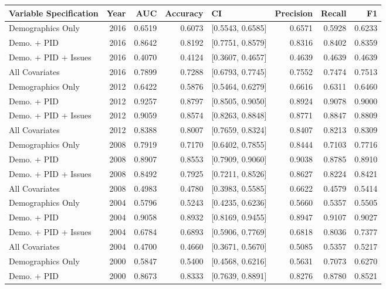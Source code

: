 \begin{longtable}{lrrrlrrr}
  \toprule
Variable Specification & Year & AUC & Accuracy & CI & Precision & Recall & F1 \\ 
  \midrule
Demographics Only & 2016 & 0.6519 & 0.6073 & [0.5543, 0.6585] & 0.6571 & 0.5928 & 0.6233 \\ 
  Demo. + PID & 2016 & 0.8642 & 0.8192 & [0.7751, 0.8579] & 0.8316 & 0.8402 & 0.8359 \\ 
  Demo. + PID + Issues & 2016 & 0.4070 & 0.4124 & [0.3607, 0.4657] & 0.4639 & 0.4639 & 0.4639 \\ 
  All Covariates & 2016 & 0.7899 & 0.7288 & [0.6793, 0.7745] & 0.7552 & 0.7474 & 0.7513 \\ 
  Demographics Only & 2012 & 0.6422 & 0.5876 & [0.5464, 0.6279] & 0.6616 & 0.6311 & 0.6460 \\ 
  Demo. + PID & 2012 & 0.9257 & 0.8797 & [0.8505, 0.9050] & 0.8924 & 0.9078 & 0.9000 \\ 
  Demo. + PID + Issues & 2012 & 0.9059 & 0.8574 & [0.8263, 0.8848] & 0.8771 & 0.8847 & 0.8809 \\ 
  All Covariates & 2012 & 0.8388 & 0.8007 & [0.7659, 0.8324] & 0.8407 & 0.8213 & 0.8309 \\ 
  Demographics Only & 2008 & 0.7919 & 0.7170 & [0.6402, 0.7855] & 0.8444 & 0.7103 & 0.7716 \\ 
  Demo. + PID & 2008 & 0.8907 & 0.8553 & [0.7909, 0.9060] & 0.9038 & 0.8785 & 0.8910 \\ 
  Demo. + PID + Issues & 2008 & 0.8492 & 0.7925 & [0.7211, 0.8526] & 0.8627 & 0.8224 & 0.8421 \\ 
  All Covariates & 2008 & 0.4983 & 0.4780 & [0.3983, 0.5585] & 0.6622 & 0.4579 & 0.5414 \\ 
  Demographics Only & 2004 & 0.5796 & 0.5243 & [0.4235, 0.6236] & 0.5660 & 0.5357 & 0.5505 \\ 
  Demo. + PID & 2004 & 0.9058 & 0.8932 & [0.8169, 0.9455] & 0.8947 & 0.9107 & 0.9027 \\ 
  Demo. + PID + Issues & 2004 & 0.6784 & 0.6893 & [0.5906, 0.7769] & 0.6818 & 0.8036 & 0.7377 \\ 
  All Covariates & 2004 & 0.4700 & 0.4660 & [0.3671, 0.5670] & 0.5085 & 0.5357 & 0.5217 \\ 
  Demographics Only & 2000 & 0.5847 & 0.5400 & [0.4568, 0.6216] & 0.5631 & 0.7073 & 0.6270 \\ 
  Demo. + PID & 2000 & 0.8673 & 0.8333 & [0.7639, 0.8891] & 0.8276 & 0.8780 & 0.8521 \\ 

\end{longtable}
